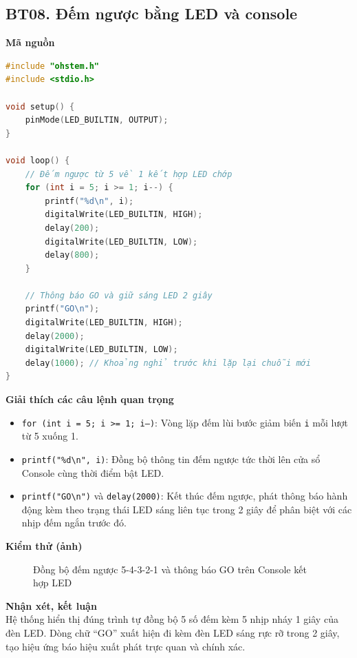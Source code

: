 \subsection*{BT08. Đếm ngược bằng LED và console}

\noindent\textbf{Mã nguồn}\\
\begin{lstlisting}[language=C]
#include "ohstem.h"
#include <stdio.h>

void setup() {
    pinMode(LED_BUILTIN, OUTPUT);
}

void loop() {
    // Đếm ngược từ 5 về 1 kết hợp LED chớp
    for (int i = 5; i >= 1; i--) {
        printf("%d\n", i);
        digitalWrite(LED_BUILTIN, HIGH);
        delay(200);
        digitalWrite(LED_BUILTIN, LOW);
        delay(800);
    }

    // Thông báo GO và giữ sáng LED 2 giây
    printf("GO\n");
    digitalWrite(LED_BUILTIN, HIGH);
    delay(2000);
    digitalWrite(LED_BUILTIN, LOW);
    delay(1000); // Khoảng nghỉ trước khi lặp lại chuỗi mới
}
\end{lstlisting}

\noindent\textbf{Giải thích các câu lệnh quan trọng}\\
\begin{itemize}
    \item \texttt{for (int i = 5; i >= 1; i--)}: Vòng lặp đếm lùi bước giảm biến \texttt{i} mỗi lượt từ 5 xuống 1.
    \item \texttt{printf("\%d\textbackslash n", i)}: Đồng bộ thông tin đếm ngược tức thời lên cửa sổ Console cùng thời điểm bật LED.
    \item \texttt{printf("GO\textbackslash n")} và \texttt{delay(2000)}: Kết thúc đếm ngược, phát thông báo hành động kèm theo trạng thái LED sáng liên tục trong 2 giây để phân biệt với các nhịp đếm ngắn trước đó.
\end{itemize}

\noindent\textbf{Kiểm thử (ảnh)}\\
\begin{figure}[H]
    \centering
    \caption{Đồng bộ đếm ngược 5-4-3-2-1 và thông báo GO trên Console kết hợp LED}
    \label{fig:bt08}
\end{figure}

\noindent\textbf{Nhận xét, kết luận}\\
Hệ thống hiển thị đúng trình tự đồng bộ 5 số đếm kèm 5 nhịp nháy 1 giây của đèn LED. Dòng chữ ``GO'' xuất hiện đi kèm đèn LED sáng rực rỡ trong 2 giây, tạo hiệu ứng báo hiệu xuất phát trực quan và chính xác.
